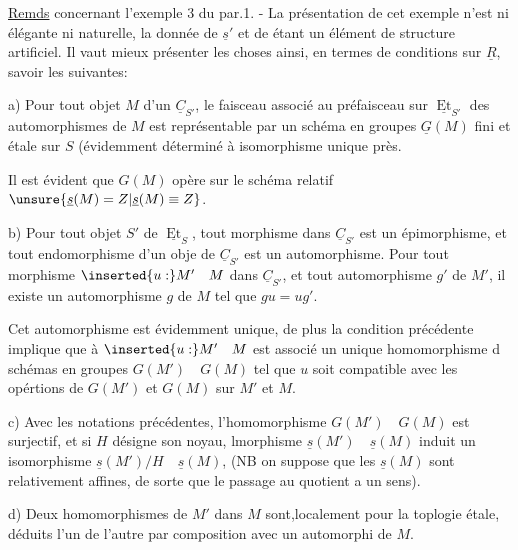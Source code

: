 
\uline{Remds} concernant l'exemple 3 du par.1. - La présentation de cet exemple n'est ni élégante ni naturelle, la donnée de $\underline{s}'$ et de \quad étant un élément de structure artificiel. Il vaut mieux présenter les choses ainsi, en termes de conditions sur $\underline{R}$, savoir les suivantes:

a) Pour tout objet $M$ d'un $\underline{C}_{S'}$, le faisceau  associé au préfaisceau sur $\underline{\operatorname{Et}}_{S'}$ des automorphismes de $M$ est  représentable par un schéma en groupes $\underline{G}(M)$ fini et étale sur $S$ (évidemment déterminé à isomorphisme unique près.

Il est évident que $G(M)$ opère sur le schéma relatif $\unsure{\underline{s}(M)=Z|\underline{s}(M)\equiv Z}$.

b) Pour tout objet $S'$ de $\underline{\operatorname{Et}}_S$, tout morphisme  dans $\underline{C}_{S'}$ est un épimorphisme, et tout endomorphisme d'un obje de $\underline{C}_{S'}$ est un automorphisme. Pour tout morphisme $\inserted{u:}M'\quad M$ dans $\underline{C}_{S'}$, et tout automorphisme $g'$ de $M'$, il existe un automorphisme $g$ de $M$ tel que $gu=ug'$.

Cet automorphisme est évidemment unique, de plus la condition précédente implique que à $\inserted{u:}M'\quad M$ est associé un unique homomorphisme d schémas en groupes $G(M')\quad G(M)$ tel que $u$ soit compatible avec les opértions de $G(M')$ et $G(M)$ sur $M'$ et $M$.

c) Avec les notations précédentes,  l'homomorphisme $G(M')\quad G(M)$ est surjectif, et si $H$ désigne son noyau, lmorphisme $\underline{s}(M')\quad\underline{s}(M)$ induit un  isomorphisme $\underline{s}(M')/H\quad\underline{s}(M)$,  (NB on suppose que les $\underline{s}(M)$ sont  relativement affines, de sorte que le passage au quotient a un sens).

d) Deux homomorphismes de $M'$ dans $M$ sont,localement pour la toplogie étale, déduits l'un de l'autre par composition avec un automorphi de $M$.

